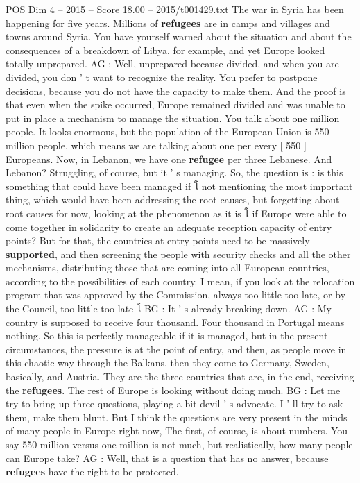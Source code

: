 \begin{textsample}{POS Dim 4 – 2015 – Score 18.00 – 2015/t001429.txt}
The war in Syria has been happening for five years.
Millions of \textbf{refugees} are in camps and villages and towns around Syria.
You have yourself warned about the situation and about the consequences of a breakdown of Libya, for example, and yet Europe looked totally unprepared.
AG : Well, unprepared because divided, and when you are divided, you don ' t want to recognize the reality.
You prefer to postpone decisions, because you do not have the capacity to make them.
And the proof is that even when the spike occurred, Europe remained divided and was unable to put in place a mechanism to manage the situation.
You talk about one million people.
It looks enormous, but the population of the European Union is 550 million people, which means we are talking about one per every [ 550 ] Europeans.
Now, in Lebanon, we have one \textbf{refugee} per three Lebanese.
And Lebanon?
Struggling, of course, but it ' s managing.
So, the question is : is this something that could have been managed if โ not mentioning the most important thing, which would have been addressing the root causes, but forgetting about root causes for now, looking at the phenomenon as it is โ if Europe were able to come together in solidarity to create an adequate reception capacity of entry points?
But for that, the countries at entry points need to be massively \textbf{supported}, and then screening the people with security checks and all the other mechanisms, distributing those that are coming into all European countries, according to the possibilities of each country.
I mean, if you look at the relocation program that was approved by the Commission, always too little too late, or by the Council, too little too late โ BG : It ' s already breaking down.
AG : My country is supposed to receive four thousand.
Four thousand in Portugal means nothing.
So this is perfectly manageable if it is managed, but in the present circumstances, the pressure is at the point of entry, and then, as people move in this chaotic way through the Balkans, then they come to Germany, Sweden, basically, and Austria.
They are the three countries that are, in the end, receiving the \textbf{refugees}.
The rest of Europe is looking without doing much.
BG : Let me try to bring up three questions, playing a bit devil ' s advocate.
I ' ll try to ask them, make them blunt.
But I think the questions are very present in the minds of many people in Europe right now, The first, of course, is about numbers.
You say 550 million versus one million is not much, but realistically, how many people can Europe take?
AG : Well, that is a question that has no answer, because \textbf{refugees} have the right to be protected.

\end{textsample}
